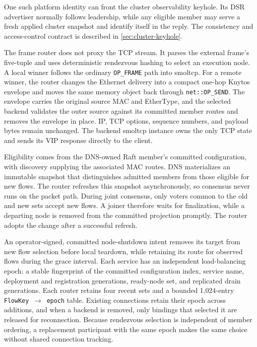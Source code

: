 One such platform identity can front the cluster observability keyhole. Its DSR
advertiser normally follows leadership, while any eligible member may serve a
fresh applied cluster snapshot and identify itself in the reply.
The consistency and access-control contract is described in
\autoref{sec:cluster-keyhole}.

The frame router does not proxy the TCP stream. It parses the external frame's
five-tuple and uses deterministic rendezvous hashing to select an execution
node. A local winner follows the ordinary
\texttt{OP\_FRAME} path into smoltcp. For a remote winner, the router changes
the Ethernet delivery into a compact one-hop Knytos envelope and moves the
same memory object back through \texttt{net::OP\_SEND}. The envelope carries
the original source MAC and EtherType, and the selected backend validates the
outer source against its committed member routes and removes the envelope in
place. IP, TCP options, sequence numbers, and payload bytes remain unchanged.
The
backend smoltcp instance owns the only TCP state and sends its VIP response
directly to the client.

Eligibility comes from the DNS-owned Raft member's committed configuration,
with discovery supplying the associated MAC routes. DNS materializes an
immutable snapshot that distinguishes admitted members from those eligible for
new flows. The router refreshes this snapshot asynchronously, so consensus never
runs on the packet path. During joint consensus, only voters common to the old
and new sets accept new flows. A joiner therefore waits for finalization, while
a departing node is removed from the committed projection promptly. The router
adopts the change after a successful refresh.

An operator-signed, committed node-shutdown intent removes its target from new
flow selection before local teardown, while retaining its route for observed
flows during the grace interval. Each service has an independent
load-balancing epoch: a stable fingerprint of the committed configuration
index, service name, deployment and registration generations, ready-node set,
and replicated drain generations. Each router retains four recent sets and a
bounded 1,024-entry \texttt{FlowKey $\rightarrow$ epoch} table. Existing
connections retain their epoch across additions, and when a backend is removed,
only bindings that selected it are released for reconnection. Because rendezvous
selection is independent of member ordering, a replacement participant with
the same epoch makes the same choice without shared connection tracking.

